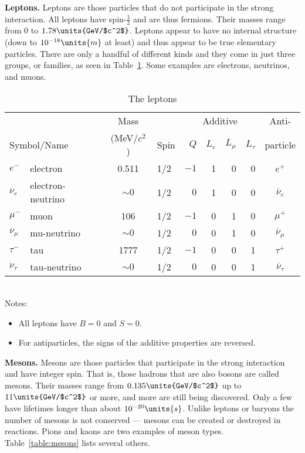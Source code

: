 {\bf Leptons.}  Leptons are those particles that do not participate in
the strong interaction.  All leptons have spin-$\textstyle{\frac{1}{2}}$ 
and are thus
fermions.  Their masses range from 0 to $1.78\units{GeV/$c^2$}$.  Leptons
appear to have no internal structure (down to $10^{-18}\units{m}$ at least)
and thus appear to be true elementary particles.  There are only a
handful of different kinds and they come in just three groups, or
families, as seen in Table~\ref{table:leptons}.  Some examples are
electrons, neutrinos, and muons.

\begin{table}
\caption{The leptons}
\label{table:leptons}
\begin{tabular}[b]{llclrrrrc}
&& Mass && \multicolumn{4}{|c|}{Additive}& Anti- \\
\multicolumn{2}{l}{Symbol/Name} & (MeV/$c^2$) & Spin\hspace{4mm} &
\multicolumn{1}{|r}{$Q$}
 & $L_e$ & $L_\mu$ & \multicolumn{1}{r|}{$L_\tau$} & particle \\
\hline\hline
$e^-$   & electron          & 0.511    & 1/2 & $-1$ & 1 & 0 & 0 & $e^+$      \\
$\nu_e$ & electron-neutrino & $\sim 0$ & 1/2 & $ 0$ & 1 & 0 & 0 & $\overline\nu_e$\\
[0.5ex]
$\mu^-$  & muon             & 106      & 1/2 & $-1$ & 0 & 1 & 0  & $\mu^+$ \\
$\nu_\mu$ & mu-neutrino     & $\sim 0$ & 1/2 & $ 0$ & 0 & 1 & 0 & $\overline\nu_\mu$\\
[0.5ex]
$\tau^-$ & tau              & 1777     & 1/2 & $-1$ & 0 & 0 & 1  & $\tau^+$ \\
$\nu_\tau$ & tau-neutrino   & $\sim 0$ & 1/2 & $ 0$ & 0 & 0 & 1 & $\overline\nu_\tau$\\
\hline
\end{tabular}\\[0.5ex]
Notes:
\begin{itemize}
\item All leptons have $B=0$ and $S=0$.
\item For antiparticles, the signs of the additive properties are reversed.
\end{itemize}
\end{table}

{\bf Mesons.}  Mesons are those particles that participate in the
strong interaction and have integer spin.  That is, those hadrons that
are also bosons are called mesons.  Their masses range from 
$0.135\units{GeV/$c^2$}$ up to $11\units{GeV/$c^2$}$ or more, and more are
still being discovered.  Only a few have lifetimes longer than about
$10^{-20}\units{s}$.  Unlike leptons or baryons the number of mesons
is not conserved --- mesons can be created or destroyed in reactions.
Pions and kaons are two examples of meson types.  Table~\ref{table:mesons}
lists several others.

